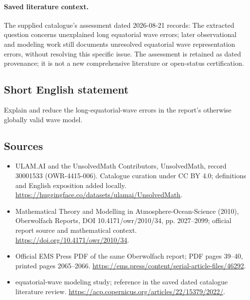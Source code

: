 \documentclass[11pt]{article}
\begin{document}
\paragraph{Saved literature context.} The supplied catalogue's assessment dated 2026-08-21 records: The extracted question concerns unexplained long equatorial wave errors; later observational and modeling work still documents unresolved equatorial wave representation errors, without resolving this specific issue. The assessment is retained as dated provenance; it is not a new comprehensive literature or open-status certification.
\subsection{Short English statement}
Explain and reduce the long-equatorial-wave errors in the report's otherwise globally valid wave model.
\subsection{Sources}
\begin{itemize}
\item[\hypertarget{source:30001533:1}{S1}] ULAM.AI and the UnsolvedMath Contributors, UnsolvedMath, record 30001533 (OWR-4415-006). Catalogue curation under CC BY 4.0; definitions and English exposition added locally.
\url{https://huggingface.co/datasets/ulamai/UnsolvedMath}.
\item[\hypertarget{source:30001533:2}{S2}] Mathematical Theory and Modelling in Atmosphere-Ocean-Science (2010), Oberwolfach Reports, DOI 10.4171/owr/2010/34, pp. 2027--2099; official report source and mathematical context.
\url{https://doi.org/10.4171/owr/2010/34}.
\item[\hypertarget{source:30001533:3}{S3}] Official EMS Press PDF of the same Oberwolfach report; PDF pages 39--40, printed pages 2065--2066.
\url{https://ems.press/content/serial-article-files/46292}.
\item[\hypertarget{source:30001533:4}{S4}] equatorial-wave modeling study; reference in the saved dated catalogue literature review.
\url{https://acp.copernicus.org/articles/22/15379/2022/}.
\end{itemize}
\label{end:30001533}
\end{document}
